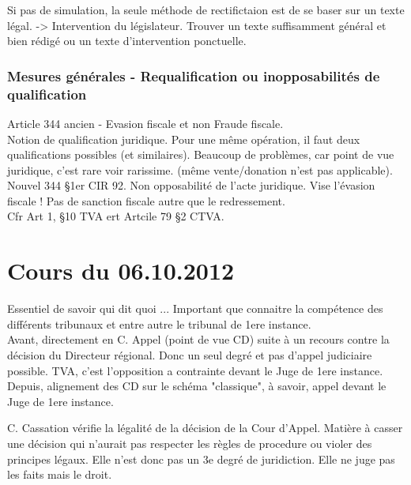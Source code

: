 \documentclass{book}
\begin{document}
Si pas de simulation, la seule méthode de rectifictaion est de se baser sur un texte légal. -> Intervention du législateur. Trouver un texte suffisamment général et bien rédigé ou un texte d'intervention ponctuelle.

\subsection{Mesures générales - Requalification ou inopposabilités de qualification}

Article 344 ancien - Evasion fiscale et non Fraude fiscale.\\

Notion de qualification juridique. Pour une même opération, il faut deux qualifications possibles (et similaires). Beaucoup de problèmes, car point de vue juridique, c'est rare voir rarissime. (même vente/donation n'est pas applicable).\\

Nouvel 344 §1er CIR 92. Non opposabilité de l'acte juridique. Vise l'évasion fiscale ! Pas de sanction fiscale autre que le redressement.\\

Cfr Art 1, §10 TVA ert Artcile 79 §2 CTVA.\\

\chapter{Cours du 06.10.2012}

Essentiel de savoir qui dit quoi ... Important que connaitre la compétence des différents tribunaux et entre autre le tribunal de 1ere instance.\\

Avant, directement en C. Appel (point de vue CD) suite à un recours contre la décision du Directeur régional.  Donc un seul degré et pas d'appel judiciaire possible. TVA, c'est l'opposition a contrainte devant le Juge de 1ere instance.\\

Depuis, alignement des CD sur le schéma "classique", à savoir, appel devant le Juge de 1ere instance.

C. Cassation vérifie la légalité de la décision de la Cour d'Appel. Matière à casser une décision qui n'aurait pas respecter les règles de procedure ou violer des principes légaux. Elle n'est donc pas un 3e degré de juridiction. Elle ne juge pas les faits mais le droit.\\
\end{document}
